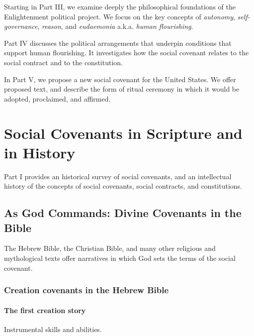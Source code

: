 \documentclass[
]{book}
\begin{document}
Starting in Part III, we examine deeply the philosophical foundations of the Enlightenment political project. We focus on the key concepts of \emph{autonomy}, \emph{self-governance}, \emph{reason}, and \emph{eudaemonia} a.k.a. \emph{human flourishing}.

Part IV discusses the political arrangements that underpin conditions that support human flourishing. It investigates how the social covenant relates to the social contract and to the constitution.

In Part V, we propose a new social covenant for the United States. We offer proposed text, and describe the form of ritual ceremony in which it would be adopted, proclaimed, and affirmed.

\hypertarget{part-social-covenants-in-scripture-and-in-history}{%
\part{Social Covenants in Scripture and in History}\label{part-social-covenants-in-scripture-and-in-history}}

Part I provides an historical survey of social covenants, and an intellectual history of the concepts of social covenants, social contracts, and constitutions.

\hypertarget{as-god-commands-divine-covenants-in-the-bible}{%
\chapter{As God Commands: Divine Covenants in the Bible}\label{as-god-commands-divine-covenants-in-the-bible}}

The Hebrew Bible, the Christian Bible, and many other religious and mythological texts offer narratives in which God sets the terms of the social covenant.

\hypertarget{creation-covenants-in-the-hebrew-bible}{%
\section{Creation covenants in the Hebrew Bible}\label{creation-covenants-in-the-hebrew-bible}}

\hypertarget{the-first-creation-story}{%
\subsection{The first creation story}\label{the-first-creation-story}}

Instrumental skills and abilities.
\end{document}
